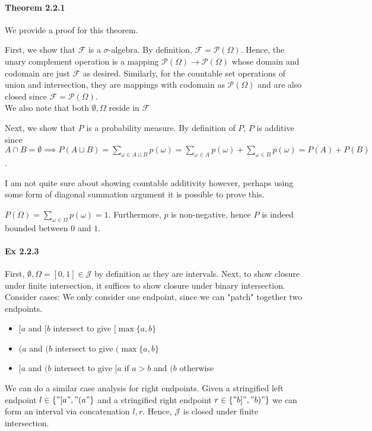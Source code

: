 \documentclass[a4paper]{article}
\newcommand{\powerset}[1]{\mathcal{P}(#1)}
\newcommand{\semialg}[0]{\mathcal{J}} %
\begin{document}
\paragraph{Theorem 2.2.1} We provide a proof for this theorem.

First, we show that $\mathcal{F}$ is a $\sigma$-algebra. By definition, $\mathcal{F} = \powerset{\Omega}$. Hence, the unary complement operation is a mapping $\mathcal{P}(\Omega)\rightarrow \mathcal{P}(\Omega)$ whose domain and codomain are just $\mathcal{F}$ as desired. Similarly, for the countable set operations of union and intersection, they are mappings with codomain as $\powerset{\Omega}$ and are also closed since $\mathcal{F} = \powerset{\Omega}$.\\
We also note that both $\emptyset, \Omega$ reside in $\mathcal{F}$

Next, we show that $P$ is a probability measure. By definition of $P$, $P$ is additive since $A\cap B=\emptyset \implies P(A\sqcup B) = \sum_{\omega \in A\sqcup B}p(\omega) = \sum_{\omega \in A}p(\omega) + \sum_{\omega \in B}p(\omega) = P(A) + P(B)$. 

I am not quite sure about showing countable additivity however, perhaps using some form of diagonal summation argument it is possible to prove this.

$P(\Omega) = \sum_{\omega \in \Omega}p(\omega) = 1$. Furthermore, $p$ is non-negative, hence $P$ is indeed bounded between $0$ and $1$.

\paragraph{Ex 2.2.3} First, $\emptyset, \Omega = [0,1] \in \semialg$ by definition as they are intervals. Next, to show closure under finite intersection, it suffices to show closure under binary intersection. Consider cases: We only consider one endpoint, since we can "patch" together two endpoints.
\begin{itemize}
	\item $[a$ and $[b$ intersect to give $[\max\{a,b\}$
	\item $(a$ and $(b$ intersect to give $(\max\{a,b\}$
	\item $[a$ and $(b$ intersect to give $[a$ if $a > b$ and $(b$ otherwise
\end{itemize}
We can do a similar case analysis for right endpoints.
Given a stringified left endpoint $l\in \{ "[a", "(a" \}$ and a stringified right endpoint $r\in \{ "b]", "b)" \}$ we can form an interval via concatenation $l,r$.
Hence, $\semialg$ is closed under finite intersection.
\end{document}
